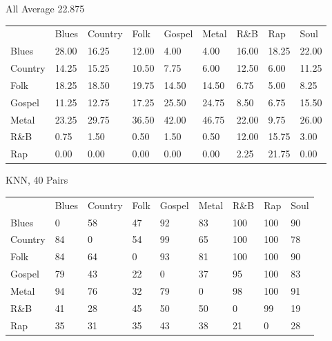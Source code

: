 \documentclass[a4paper,oneside]{article}
\begin{document}
All
Average 22.875
\begin{table}
\begin{tabular}{|l||*{8}{l|}} \hline
 & Blues & Country & Folk & Gospel & Metal & R\&B & Rap & Soul \\ \hhline{|=||*{8}{=|}}
Blues & 28.00 & 16.25 & 12.00 & 4.00 & 4.00 & 16.00 & 18.25 & 22.00 \\ \hline
Country & 14.25 & 15.25 & 10.50 & 7.75 & 6.00 & 12.50 & 6.00 & 11.25 \\ \hline
Folk & 18.25 & 18.50 & 19.75 & 14.50 & 14.50 & 6.75 & 5.00 & 8.25 \\ \hline
Gospel & 11.25 & 12.75 & 17.25 & 25.50 & 24.75 & 8.50 & 6.75 & 15.50 \\ \hline
Metal & 23.25 & 29.75 & 36.50 & 42.00 & 46.75 & 22.00 & 9.75 & 26.00 \\ \hline
R\&B & 0.75 & 1.50 & 0.50 & 1.50 & 0.50 & 12.00 & 15.75 & 3.00 \\ \hline
Rap & 0.00 & 0.00 & 0.00 & 0.00 & 0.00 & 2.25 & 21.75 & 0.00 \\ \hline
\end{tabular}
\end{table}

KNN, 40
Pairs
\begin{table}
\begin{tabular}{|l||*{8}{l|}} \hline
 & Blues & Country & Folk & Gospel & Metal & R\&B & Rap & Soul \\ \hhline{|=||*{8}{=|}}
Blues & 0 & 58 & 47 & 92 & 83 & 100 & 100 & 90 \\ \hline
Country & 84 & 0 & 54 & 99 & 65 & 100 & 100 & 78 \\ \hline
Folk & 84 & 64 & 0 & 93 & 81 & 100 & 100 & 90 \\ \hline
Gospel & 79 & 43 & 22 & 0 & 37 & 95 & 100 & 83 \\ \hline
Metal & 94 & 76 & 32 & 79 & 0 & 98 & 100 & 91 \\ \hline
R\&B & 41 & 28 & 45 & 50 & 50 & 0 & 99 & 19 \\ \hline
Rap & 35 & 31 & 35 & 43 & 38 & 21 & 0 & 28 \\ \hline
\end{tabular}
\end{table}
\end{document}
